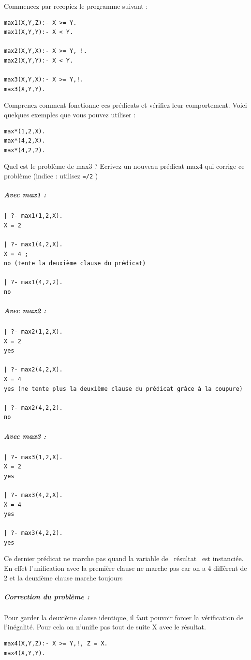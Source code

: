 \documentclass[a4paper]{article}
\newenvironment{CAnswer}{\color{red}\begin{Answer}}
                        {\end{Answer}}
\begin{document}
\begin{Exercise}[title={calcul du maximum}]
Commencez par recopiez le programme suivant :
\begin{verbatim}
max1(X,Y,Z):- X >= Y.
max1(X,Y,Y):- X < Y.

max2(X,Y,X):- X >= Y, !.
max2(X,Y,Y):- X < Y.

max3(X,Y,X):- X >= Y,!.
max3(X,Y,Y).
\end{verbatim}

Comprenez comment fonctionne ces prédicats et vérifiez leur comportement.
Voici quelques exemples que vous pouvez utiliser :
\begin{verbatim}
max*(1,2,X).
max*(4,2,X).
max*(4,2,2).
\end{verbatim}

Quel est le problème de max3 ? Ecrivez un nouveau prédicat max4 qui corrige
ce problème (indice : utilisez \verb#=/2# )
\end{Exercise}
\begin{CAnswer}
\subparagraph{Avec max1 :}
\begin{verbatim}
| ?- max1(1,2,X). 
X = 2 

| ?- max1(4,2,X). 
X = 4 ;
no (tente la deuxième clause du prédicat)

| ?- max1(4,2,2). 
no 
\end{verbatim}

\subparagraph{Avec max2 :}
\begin{verbatim}
| ?- max2(1,2,X). 
X = 2 
yes 

| ?- max2(4,2,X). 
X = 4 
yes (ne tente plus la deuxième clause du prédicat grâce à la coupure)

| ?- max2(4,2,2). 
no 
\end{verbatim}

\subparagraph{Avec max3 :}
\begin{verbatim}
| ?- max3(1,2,X). 
X = 2 
yes 

| ?- max3(4,2,X). 
X = 4 
yes 

| ?- max3(4,2,2). 
yes 
\end{verbatim}
Ce dernier prédicat ne marche pas quand la variable de  résultat  est
instanciée. En effet l'unification avec la première clause ne marche pas
car on a 4 différent de 2 et la deuxième clause marche toujours

\subparagraph{Correction du problème :}
Pour garder la deuxième clause identique, il faut pouvoir forcer la 
vérification de l'inégalité. Pour cela on n'unifie pas tout de suite X avec
le résultat.
\begin{verbatim}
max4(X,Y,Z):- X >= Y,!, Z = X.
max4(X,Y,Y).
\end{verbatim}
\end{CAnswer}
\end{document}
